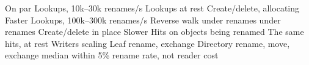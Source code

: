 %
%
\dctab
\pgfplotstablegetrowsof{\dctab}
\of\dctab        \let\dcTop\pgfplotsretval
{}\of\dctab  \let\dcBot\pgfplotsretval

\def\dclabel#1#2{\expandafter\def\csname dcL/#1\endcsname{#2}}
\dclabel{hdr-par}{On par}
\dclabel{lookup-low}{Lookups, 10k--30k renames/s}
\dclabel{lookup-rest}{Lookups at rest}
\dclabel{churn-alloc}{Create/delete, allocating}
\dclabel{hdr-faster}{Faster}
\dclabel{lookup-high}{Lookups, 100k--300k renames/s}
\dclabel{dpath}{Reverse walk under renames}
\dclabel{readdir}{ under renames}
\dclabel{churn-inplace}{Create/delete in place}
\dclabel{hdr-slower}{Slower}
\dclabel{hit}{Hits on objects being renamed}
\dclabel{hit-rest}{The same hits, at rest}
\dclabel{hdr-capacity}{Writers scaling}
\dclabel{cap-leaf}{Leaf rename, exchange}
\dclabel{cap-dir}{Directory rename, move, exchange}
\dclabel{note-par}{median within 5\%}
\dclabel{note-faster}{}
\dclabel{note-slower}{}
\dclabel{note-capacity}{rename rate, not reader cost}

